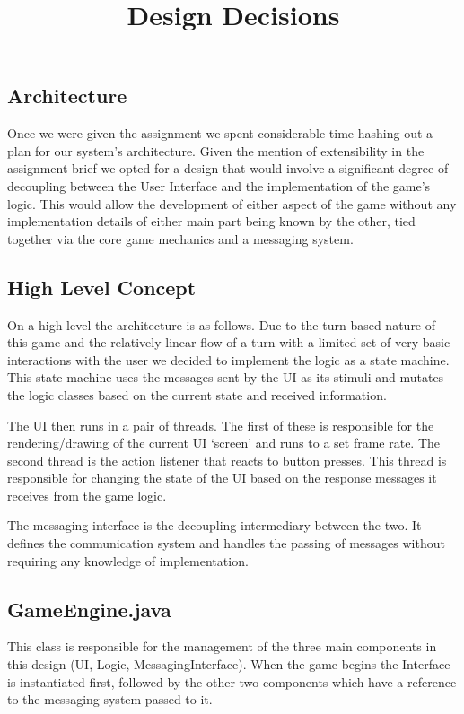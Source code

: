 \documentclass[a4paper, 11pt]{article}
\title{Design Decisions}
\begin{document}
	\maketitle
	\subsection*{Architecture}
	Once we were given the assignment we spent considerable time hashing out a plan for our system's architecture. Given the mention of extensibility in the assignment brief we opted for a design that would involve a significant degree of decoupling between the User Interface and the implementation of the game's logic. This would allow the development of either aspect of the game without any implementation details of either main part being known by the other, tied together via the core game mechanics and a messaging system.
	\subsection*{High Level Concept}
	On a high level the architecture is as follows. Due to the turn based nature of this game and the relatively linear flow of a turn with a limited set of very basic interactions with the user we decided to implement the logic as a state machine. This state machine uses the messages sent by the UI as its stimuli and mutates the logic classes based on the current state and received information.\par 
	\noindent The UI then runs in a pair of threads. The first of these is responsible for the rendering/drawing of the current UI `screen' and runs to a set frame rate. The second thread is the action listener that reacts to button presses. This thread is responsible for changing the state of the UI based on the response messages it receives from the game logic.\par 
	\noindent The messaging interface is the decoupling intermediary between the two. It defines the communication system and handles the passing of messages without requiring any knowledge of implementation.
	
	\subsection*{GameEngine.java}
	This class is responsible for the management of the three main components in this design (UI, Logic, MessagingInterface). %
	When the game begins the Interface is instantiated first, followed by the other two components which have a reference to the messaging system passed to it.
		
\end{document}
